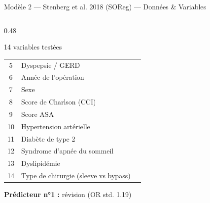\documentclass[aspectratio=169]{beamer}
\newcommand{\oui}{\textcolor{vertdoux}{\textbf{\checkmark}}}
\newcommand{\non}{\textcolor{rougealerte}{\textbf{\texttimes}}}
\begin{document}
\begin{frame}[shrink=5]{Modèle 2 --- Stenberg et al. 2018 (SOReg) --- Données \& Variables}
\begin{columns}[T]
\begin{column}{0.48\textwidth}
\begin{block}{14 variables testées}
\begin{tabular}{clc}
          5  & Dyspepsie / GERD & \oui \\
          6  & Année de l'opération & \oui \\
          7  & Sexe & \oui \\
          8  & Score de Charlson (CCI) & \oui \\
          9  & Score ASA & \oui \\
          10 & Hypertension artérielle & \non \\
          11 & Diabète de type 2 & \non \\
          12 & Syndrome d'apnée du sommeil & \non \\
          13 & Dyslipidémie & \non \\
          14 & Type de chirurgie (sleeve vs bypass) & \non \\
          \bottomrule
        \end{tabular}
        \vspace{2pt}
        {\footnotesize\textbf{Prédicteur n°1 :} révision (OR std. 1.19)}
      \end{block}
    \end{column}
  \end{columns}
\end{frame}
\end{document}
